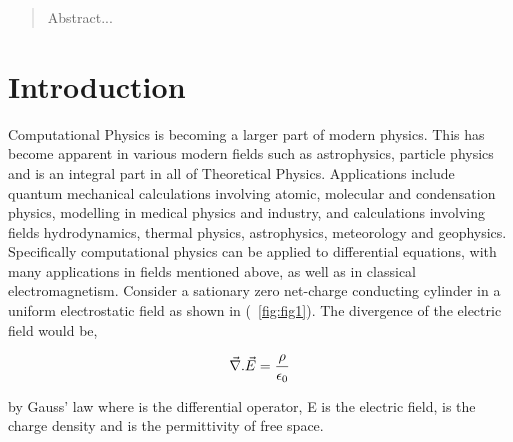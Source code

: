 \documentclass[aps,twocolumn,pre,nofootinbib]{revtex4}
\begin{document}

\date{\today}

\begin{abstract}

Abstract... 
  
\end{abstract}


\maketitle



\section{Introduction \label{sec:int}}

Computational Physics is becoming a larger part of modern physics. This has become apparent in various modern fields such as astrophysics, particle physics and is an integral part in all of Theoretical Physics. Applications include quantum mechanical calculations involving atomic, molecular and condensation physics, modelling in medical physics and industry, and calculations involving fields hydrodynamics, thermal physics, astrophysics, meteorology and geophysics. 
Specifically computational physics can be applied to differential equations, with many applications in fields mentioned above, as well as in classical electromagnetism.
Consider a sationary zero net-charge conducting cylinder in a uniform electrostatic field as shown in (~\ref{fig:fig1}). The divergence of the electric field would be,

\begin{equation}
\begin{split}
\vec{\nabla}.\vec{E}= \frac{\rho}{\epsilon_0} 
\end{split}
\label{eqn1}
\end{equation}

by Gauss' law where \del is the differential operator, E is the electric field, \den  is the charge density and \per is the permittivity of free space.
\end{document}

